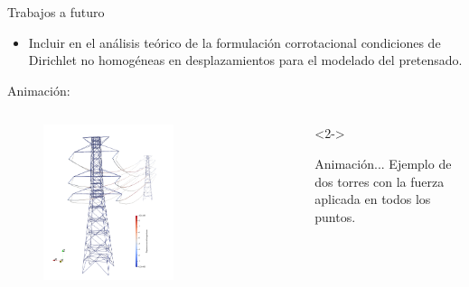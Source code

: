 \documentclass[
  aspectratio=169,
]{beamer}
\begin{document}
\begin{small}
\begin{frame}{Trabajos a futuro }
\begin{itemize}
		\pause 
		\item Incluir en el análisis teórico de la formulación corrotacional condiciones de Dirichlet no homogéneas en desplazamientos para el modelado del pretensado.
	\end{itemize}
\end{frame}
\begin{frame}[t]{Animación:}
	\begin{columns}[T,onlytextwidth]
		\begin{column}{.58\textwidth}
			\begin{minipage}{\textwidth}
				\vspace{-.5cm}
				\begin{figure}[htbp]
					\centering
				\includegraphics[width=0.6\textwidth]{./imagenes/ResultadosNumericos/TransmissionTormenta/Perspectiva.png}
				\end{figure}
			\end{minipage}  
		\end{column}
		\begin{column}{.4\textwidth}
			\begin{onlyenv}<2->
				\begin{minipage}{\textwidth}
					\begin{block}{Animación...}
						Ejemplo de dos torres con la fuerza aplicada en todos los puntos. 
					\end{block}
				\end{minipage}
			\end{onlyenv}
		\end{column}
	\end{columns}
\end{frame}


\end{small}
\end{document}
